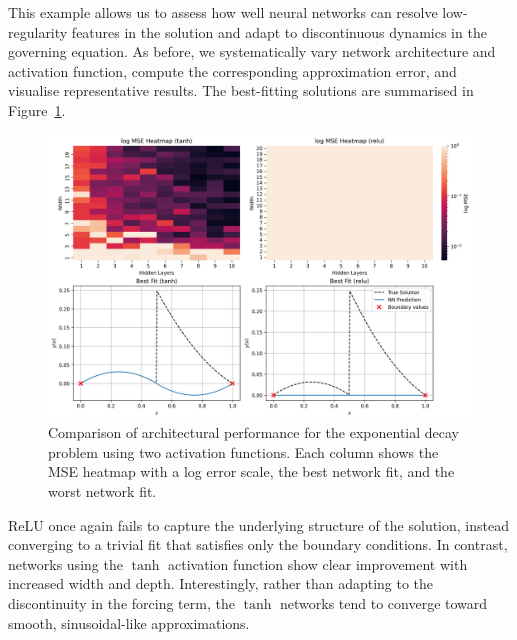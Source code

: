 This example allows us to assess how well neural networks can resolve low-regularity features in 
the solution and adapt to discontinuous dynamics in the governing equation. As before, we 
systematically vary network architecture and activation function, compute the corresponding 
approximation error, and visualise representative results. The best-fitting solutions are 
summarised in Figure~\ref{fig:bvp_piecewise_sidebyside}.

\begin{figure}[htbp]
    \centering
    \includegraphics[width=\textwidth]{graphics/bvp_piecewise_combined.png}
    \caption{Comparison of architectural performance for the exponential decay problem using two 
    activation functions. Each column shows the MSE heatmap with a log error scale,
    the best network fit, and the worst network fit.}
    \label{fig:bvp_piecewise_sidebyside}
\end{figure}

ReLU once again fails to capture the underlying structure of the solution, instead converging to a 
trivial fit that satisfies only the boundary conditions. In contrast, networks using the 
\(\tanh\) activation function show clear improvement with increased width and depth. 
Interestingly, rather than adapting to the discontinuity in the forcing term, the 
\(\tanh\) networks tend to converge toward smooth, sinusoidal-like approximations.
